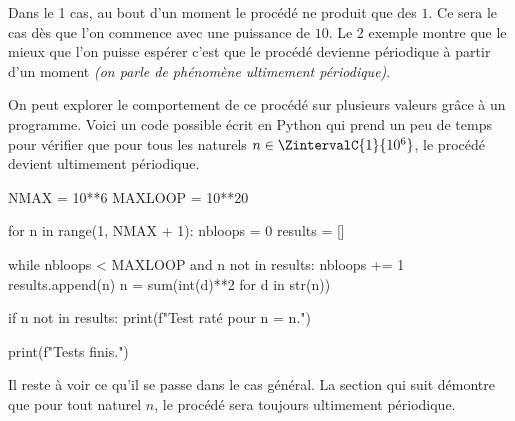 Dans le 1\ier{} cas, au bout d'un moment le procédé ne produit que des $1$. Ce sera le cas dès que l'on commence avec une puissance de $10$. Le 2\ieme{} exemple montre que le mieux que l'on puisse espérer c'est que le procédé devienne périodique à partir d'un moment \emph{(on parle de phénomène ultimement périodique)}.


\medskip

On peut explorer le comportement de ce procédé sur plusieurs valeurs grâce à un programme. Voici un code possible écrit en Python qui prend un peu de temps pour vérifier que pour tous les naturels $n \in \ZintervalC{1}{10^6}$, le procédé devient ultimement périodique.

\begin{rawcode}
NMAX    = 10**6
MAXLOOP = 10**20

for n in range(1, NMAX + 1):
    nbloops = 0
    results = []

    while nbloops < MAXLOOP and n not in results:
        nbloops += 1
        results.append(n)
        n = sum(int(d)**2 for d in str(n))

    if n not in results:
        print(f"Test raté pour n = {n}.")

print(f"Tests finis.")
\end{rawcode}

\medskip

Il reste à voir ce qu'il se passe dans le cas général. La section qui suit démontre que pour tout naturel $n$, le procédé sera toujours ultimement périodique.

